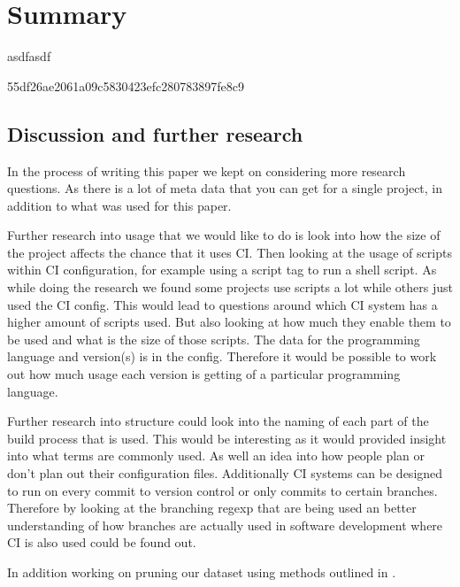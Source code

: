 \documentclass[twoside,12pt,titlepage,a4paper]{article}
\begin{document}
\section{Summary}

asdfasdf

55df26ae2061a09c5830423efc280783897fe8c9
\vspace*{-0.05in}
\subsection{Discussion and further research}
\vspace*{-0.05in}
In the process of writing this paper we kept on considering more research questions. As there is a lot of meta data that you can get for a single project, in addition to what was used for this paper.

Further research into usage that we would like to do is look into how the size of the project affects the chance that it uses CI. Then looking at the usage of scripts within CI configuration, for example using a script tag to run a shell script. As while doing the research we found some projects use scripts a lot while others just used the CI config. This would lead to questions around which CI system has a higher amount of scripts used. But also looking at how much they enable them to be used and what is the size of those scripts.
The data for the programming language and version(s) is in the config. Therefore it would be possible to work out how much usage each version is getting of a particular programming language.

Further research into structure could look into the naming of each part of the build process that is used. This would be interesting as it would provided insight into what terms are commonly used. As well an idea into how people plan or don't plan out their configuration files.
Additionally CI systems can be designed to run on every commit to version control or only commits to certain branches. Therefore by looking at the branching regexp that are being used an better understanding of how branches are actually used in software development where CI is also used could be found out.

In addition working on pruning our dataset using methods outlined in \cite{Kalliamvakou2014}. 


\end{document}
